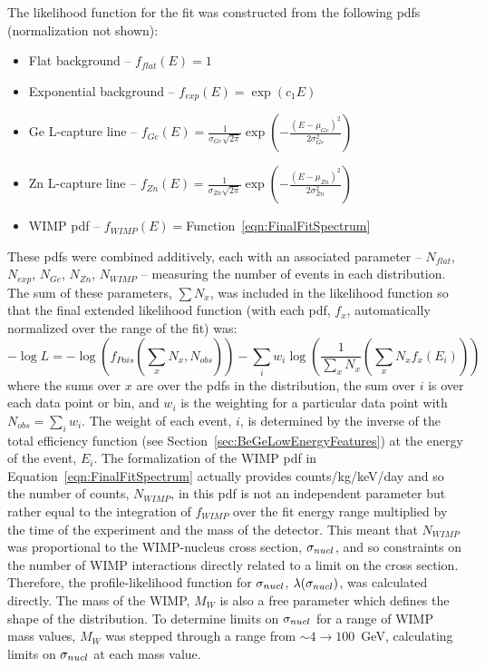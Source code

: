 The likelihood function for the fit was constructed from the following pdfs (normalization not shown):	
		\begin{itemize}
			\item Flat background --  $f_{flat}(E) = 1$
			\item Exponential background --  $f_{exp}(E) = \exp\left(c_{1} E\right)$				
			\item Ge L-capture line -- $f_{Ge}(E) = \frac{1}{\sigma_{Ge}\sqrt{2 \pi}} 
								\exp\left(-\frac{(E - \mu_{Ge})^{2}}{2 \sigma_{Ge}^{2}}\right)$
			\item Zn L-capture line -- $f_{Zn}(E) = \frac{1}{\sigma_{Zn}\sqrt{2 \pi}} 
								\exp\left(-\frac{(E - \mu_{Zn})^{2}}{2 \sigma_{Zn}^{2}}\right)$				
								
			\item WIMP pdf -- $f_{WIMP}(E) = $Function~\ref{eqn:FinalFitSpectrum}				
		\end{itemize}			
These pdfs were combined additively, each with an associated parameter -- $N_{flat}$, $N_{exp}$, $N_{Ge}$, $N_{Zn}$, $N_{WIMP}$  -- measuring the number of events in each distribution.  The sum of these parameters, $\sum N_{x}$, was included in the likelihood function so that the final extended likelihood function (with each pdf, $f_{x}$, automatically normalized over the range of the fit) was:
		\begin{equation}
			- \log L = -\log \left( f_{Pois} \left( \sum_{x} N_{x}, N_{obs} \right) \right) 
					- \sum_{i} w_{i} \log \left( 
						\frac{1}{\sum_{x} N_{x}} 
							\left( \sum_{x} N_{x} f_{x} (E_{i})
							\right) 
						\right)
		\end{equation}
where the sums over $x$ are over the pdfs in the distribution, the sum over $i$ is over each data point or bin, and $w_{i}$ is the weighting for a particular data point with $N_{obs} = \sum_{i} w_{i}$.  The weight of each event, $i$, is determined by the inverse of the total efficiency function (see Section~\ref{sec:BeGeLowEnergyFeatures}) at the energy of the event, $E_{i}$.  The formalization of the WIMP pdf in Equation~\ref{eqn:FinalFitSpectrum} actually provides counts/kg/keV/day and so the number of counts, $N_{WIMP}$, in this pdf is not an independent parameter but rather equal to the integration of $f_{WIMP}$ over the fit energy range multiplied by the time of the experiment and the mass of the detector.  This meant that $N_{WIMP}$ was proportional to the WIMP-nucleus cross section, $\sigma_{nucl}$, and so constraints on the number of WIMP interactions directly related to a limit on the cross section.  Therefore, the profile-likelihood function for $\sigma_{nucl}$, $\lambda(\sigma_{nucl})$, was calculated directly.  The mass of the WIMP, $M_{W}$ is also a free parameter which defines the shape of the distribution.  To determine limits on $\sigma_{nucl}$ for a range of WIMP mass values, $M_{W}$ was stepped through a range from $\sim4\to100$~GeV, calculating limits on $\sigma_{nucl}$ at each mass value.  

